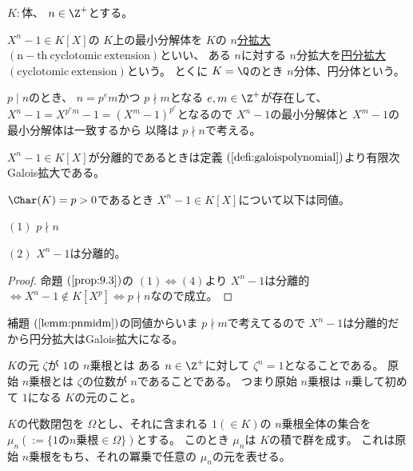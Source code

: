 \documentclass[../master_galois_theory]{subfiles}
\begin{document}
\begin{defi} \label{defi:cyclotomic}
  $K:$体、 $n \in \Z^+$とする。

  $X^n - 1 \in K[X]$の $K$上の最小分解体を $K$の
  \underline{$n$分拡大 $(\mathrm{n-th \  cyclotomic \  extension})$}といい、
  ある $n$に対する $n$分拡大を\underline{円分拡大 $(\mathrm{cyclotomic \  extension})$}という。
  とくに $K = \Q$のとき $n$分体、円分体という。

  $p \mid n$のとき、 $n = p^e m$かつ $p \nmid m$となる $e , m \in \Z^+$が存在して、 $X^n - 1 = X^{p^e m} - 1 = (X^m - 1)^{p^e}$となるので
  $X^n - 1$の最小分解体と $X^m - 1$の最小分解体は一致するから
  以降は $p \nmid n$で考える。

  $X^n - 1 \in K[X]$が分離的であるときは定義 $(\mathrm{\ref{defi:galoispolynomial}})$より有限次\rm{Galois}拡大である。
\end{defi}

\begin{lemm} \label{lemm:pnmidm}
  $\Char(K) = p > 0$であるとき $X^n - 1 \in K[X]$について以下は同値。

  $(1)$
  $p \nmid n$

  $(2)$
  $X^n - 1$は分離的。
\end{lemm}

\begin{proof}
  命題 $(\mathrm{\ref{prop:9.3}})$の $(1) \Leftrightarrow (4)$より
  $X^n - 1$は分離的 $\Leftrightarrow X^n - 1 \notin K[X^p] \Leftrightarrow p \nmid n$なので成立。
\end{proof}

\begin{rem} \label{rem:cyclotomicgalois}
  補題 $(\mathrm{\ref{lemm:pnmidm}})$の同値からいま $p \nmid m$で考えてるので
  $X^n - 1$は分離的だから円分拡大は\rm{Galois}拡大になる。
\end{rem}

\begin{defi} \label{defi:rootofunity}
  $K$の元 $\zeta$が $1$の $n$乗根とは
  ある $n \in \Z^+$に対して $\zeta^n = 1$となることである。
  原始 $n$乗根とは $\zeta$の位数が $n$であることである。
  つまり原始 $n$乗根は $n$乗して初めて $1$になる $K$の元のこと。
\end{defi}

\begin{lemm} \label{lemm:rootgroup}
  $K$の代数閉包を $\Omega$とし、それに含まれる $1 (\in K)$の $n$乗根全体の集合を
  $\mu_n (:= \{ 1の n乗根 \in \Omega \})$とする。
  このとき $\mu_n$は $K$の積で群を成す。
  これは原始 $n$乗根をもち、それの冪乗で任意の $\mu_n$の元を表せる。
\end{lemm}
\end{document}

